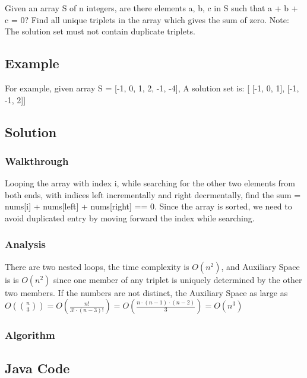 \documentclass[]{book}
\begin{document}
Given an array S of n integers, are there elements a, b, c in S such that a + b + c = 0? Find all unique triplets in the array which
gives the sum of zero. Note: The solution set must not contain duplicate triplets.

\hypertarget{example-3}{%
\subsection{Example}\label{example-3}}

For example, given array S = {[}-1, 0, 1, 2, -1, -4{]},
A solution set is:
{[}
{[}-1, 0, 1{]},
{[}-1, -1, 2{]}{]}

\hypertarget{solution-3}{%
\subsection{Solution}\label{solution-3}}

\hypertarget{walkthrough-5}{%
\subsubsection{Walkthrough}\label{walkthrough-5}}

Looping the array with index i, while searching for the other two elements from both ends, with indices
left incrementally and right decrmentally, find the sum = nums{[}i{]} + nums{[}left{]} + nums{[}right{]} == 0. Since the array is
sorted, we need to avoid duplicated entry by moving forward the index while searching.

\hypertarget{analysis-5}{%
\subsubsection{Analysis}\label{analysis-5}}

There are two nested loops, the time complexity is \(O(n^2)\), and Auxiliary Space is is \(O(n^2)\) since one member of any
triplet is uniquely determined by the other two members. If the numbers are not distinct, the Auxiliary Space as large as
\(O(\binom{n}{3}) = O(\frac{n!}{3!\cdot (n-3)!}) = O(\frac{n\cdot (n-1)\cdot(n-2)}{3}) = O(n^3)\)

\hypertarget{algorithm-5}{%
\subsubsection{Algorithm}\label{algorithm-5}}

\hypertarget{java-code-3}{%
\subsection{Java Code}\label{java-code-3}}
\end{document}
